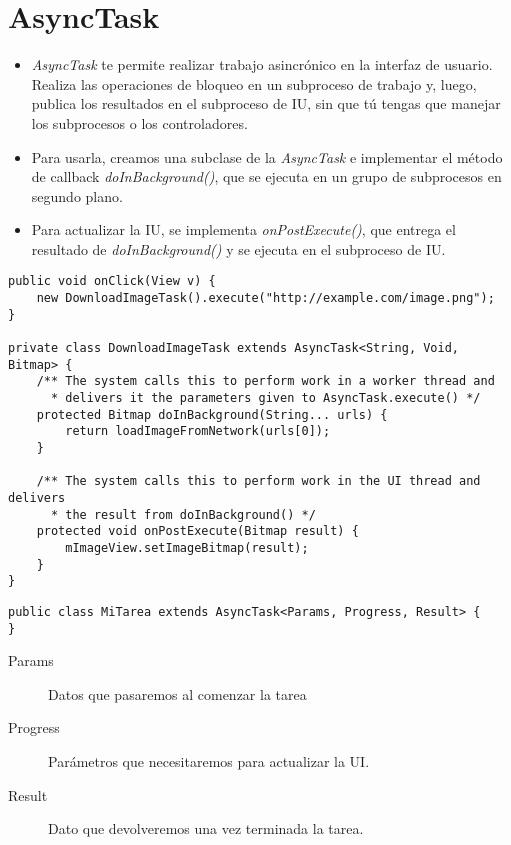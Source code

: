 \documentclass[4paper]{article}
\begin{document}
\section{AsyncTask}
\begin{itemize}
\item \emph{AsyncTask} te permite realizar trabajo asincrónico en la interfaz de usuario. Realiza las operaciones de bloqueo en un subproceso de trabajo y, luego, publica los resultados en el subproceso de IU, sin que tú tengas que manejar los subprocesos o los controladores.
\item Para usarla, creamos una subclase de la \emph{AsyncTask} e implementar el método de callback \emph{doInBackground()}, que se ejecuta en un grupo de subprocesos en segundo plano.
\item  Para actualizar la IU, se implementa \emph{onPostExecute()}, que entrega el resultado de \emph{doInBackground()} y se ejecuta en el subproceso de IU.
\end{itemize}
\begin{lstlisting}
public void onClick(View v) {
    new DownloadImageTask().execute("http://example.com/image.png");
}

private class DownloadImageTask extends AsyncTask<String, Void, Bitmap> {
    /** The system calls this to perform work in a worker thread and
      * delivers it the parameters given to AsyncTask.execute() */
    protected Bitmap doInBackground(String... urls) {
        return loadImageFromNetwork(urls[0]);
    }

    /** The system calls this to perform work in the UI thread and delivers
      * the result from doInBackground() */
    protected void onPostExecute(Bitmap result) {
        mImageView.setImageBitmap(result);
    }
}
\end{lstlisting}
\begin{lstlisting}
public class MiTarea extends AsyncTask<Params, Progress, Result> {
}
\end{lstlisting}
\begin{description}
\item[Params] Datos que pasaremos al comenzar la tarea
\item[Progress] Parámetros que necesitaremos para actualizar la UI.
\item[Result] Dato que devolveremos una vez terminada la tarea.
\end{description}

\newpage
\end{document}
